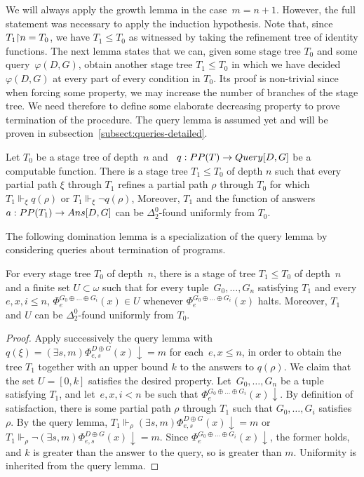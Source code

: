 We will always apply the growth lemma in the case~$m = n+1$. However, the full statement
was necessary to apply the induction hypothesis.
Note that, since $T_1 {\upharpoonright} n = T_0$, we have $T_1 \leq T_0$ as witnessed
by taking the refinement tree of identity functions.
The next lemma states that we can, given some stage tree $T_0$
and some query~$\varphi(D, G)$, obtain another stage tree $T_1 \leq T_0$ in which 
we have decided $\varphi(D, G)$ at every part of every condition in $T_0$.
Its proof is non-trivial since when forcing some property, we may increase the number
of branches of the stage tree. We need therefore to define some elaborate decreasing property
to prove termination of the procedure. The query lemma is assumed yet 
and will be proven in subsection~\ref{subsect:queries-detailed}.

\begin{lemma}\label{lem:query-lemma}
Let $T_0$ be a stage tree of depth~$n$
and ~$q : PP(T) \to \mathop{Query}[D,G]$ be a computable function.
There is a stage tree $T_1 \leq T_0$ of depth $n$
such that every partial path $\xi$ through $T_1$ refines a partial path $\rho$ through $T_0$
for which $T_1 \Vdash_\xi q(\rho)$ or $T_1 \Vdash_\xi \neg q(\rho)$,
Moreover, $T_1$ and the function of answers $a : PP(T_1) \to \mathop{Ans}[D,G]$ can be $\Delta^0_2$-found
uniformly from $T_0$.
\end{lemma}

The following domination lemma is a specialization of the query lemma
by considering queries about termination of programs.

\begin{lemma}\label{lem:domination-lemma}
For every stage tree $T_0$ of depth~$n$, there is
a stage of tree $T_1 \leq T_0$ of depth~$n$ and a finite set $U \subset \omega$ such that
for every tuple~$G_0, \dots, G_n$ satisfying $T_1$ and every $e, x, i \leq n$,
$\Phi_e^{G_0 \oplus \dots \oplus G_i}(x) \in U$ whenever $\Phi_e^{G_0 \oplus \dots \oplus G_i}(x)$ halts.
Moreover, $T_1$ and $U$ can be $\Delta^0_2$-found uniformly from $T_0$.
\end{lemma}
\begin{proof}
Apply successively the query lemma with $q(\xi) = (\exists s,m)\Phi_{e,s}^{D \oplus G}(x) \downarrow = m$
for each~$e, x \leq n$, in order to obtain the tree $T_1$ together with an upper bound $k$ to the answers to $q(\rho)$.
We claim that the set $U = [0, k]$ satisfies the desired property.
Let~$G_0, \dots, G_n$ be a tuple satisfying $T_1$, and let~$e, x, i < n$
be such that $\Phi_e^{G_0 \oplus \dots \oplus G_i}(x) \downarrow$.
By definition of satisfaction, there is some partial path $\rho$ through $T_1$
such that $G_0, \dots, G_i$ satisfies $\rho$. By the query lemma,
$T_1 \Vdash_\rho (\exists s,m)\Phi_{e,s}^{D \oplus G}(x) \downarrow = m$
or $T_1 \Vdash_\rho \neg (\exists s,m)\Phi_{e,s}^{D \oplus G}(x) \downarrow = m$.
Since $\Phi_e^{G_0 \oplus \dots \oplus G_i}(x) \downarrow$, the former holds,
and $k$ is greater than the answer to the query, so is greater than $m$.
Uniformity is inherited from the query lemma.
\end{proof}


